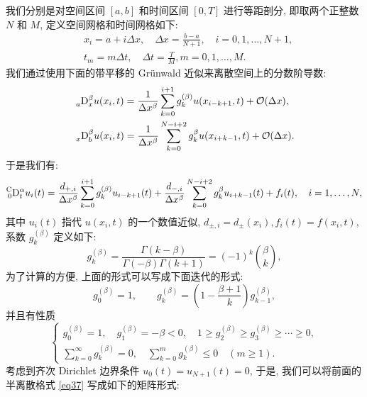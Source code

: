 \documentclass{ecnumaster}
\begin{document}
我们分别是对空间区间 $[a, b]$ 和时间区间 $[0, T]$ 进行等距剖分,
即取两个正整数 $N$ 和 $M$, 定义空间网格和时间网格如下:
\begin{align*}
  &x_i = a + i\Delta x, \quad \Delta x = \frac{b - a}{N + 1},\quad i = 0, 1, \dots , N + 1,\\
  &t_m = m\Delta t, \quad \Delta t = \frac{T}{M}, m = 0, 1, \dots ,M.
\end{align*}
我们通过使用下面的带平移的 Gr\"unwald 近似来离散空间上的分数阶导数\cite{MT04, MT06}:
\begin{equation}
  \begin{split}
  &\prescript{}{a}{\mathrm{D}}_x^{\beta}u(x_i, t) =
  \frac{1}{\Delta x^{\beta}}\sum_{k=0}^{i + 1} g_k^{(\beta)}u(x_{i-k+1}, t) + \mathcal{O}(\Delta x),\\
  &\prescript{}{x}{\mathrm{D}}_b^{\beta}u(x_i, t) =
  \frac{1}{\Delta x^{\beta}}\sum_{k=0}^{N-i+2}g_k^{\beta}u(x_{i+k-1}, t) + \mathcal{O}(\Delta x).
  \end{split}
\end{equation}
于是我们有:
\begin{equation}\label{eq37}
  \prescript{\mathrm{C}}{0}{\mathrm{D}}_t^{\alpha}u_i(t) =
  \frac{{{d}}_{+, i}}{\Delta x^{\beta}}\sum_{k=0}^{i + 1}
  g_k^{(\beta)}u_{i-k+1} (t) + \frac{{{d}}_{-,i}}{\Delta x^{\beta}}\sum_{k=0}^{N-i+2}
  g_k^{\beta}u_{i+k-1} (t) + f_i(t), \quad i = 1, \dots, N,
\end{equation}
其中 $u_i(t)$ 指代 $u(x_i, t)$ 的一个数值近似,
$d_{\pm, i}= d_{\pm}(x_i), f_i(t) = f(x_i, t)$,
系数 $g_k^{(\beta)}$ 定义如下:
\begin{equation}\label{eq38}
g_k^{(\beta)} = \frac{\Gamma(k - \beta)}{\Gamma(-\beta)\Gamma(k + 1)}
= (-1)^k {\beta \choose k},
\end{equation}
为了计算的方便, 上面的形式可以写成下面迭代的形式\cite{P99}:
$$
g_0^{(\beta)} = 1, \qquad g_k^{(\beta)} = \left(1 - \frac{\beta + 1}{k}\right)g_{k-1}^{(\beta)},
$$
并且有性质
\begin{equation}\label{eq310}
  \begin{cases}
    g_0^{(\beta)} = 1, \quad g_1^{(\beta)} = -\beta < 0, \quad 1 \ge g_2^{(\beta)} \ge g_3^{(\beta)} \ge \cdots \ge 0,\\
    \sum\limits_{k=0}^{\infty} g_k^{(\beta)} = 0, \quad \sum\limits _{k=0}^{m} g_k^{(\beta)} \leq 0 \quad (m \ge 1).
  \end{cases}
\end{equation}
考虑到齐次 Dirichlet 边界条件 $u_0(t) = u_{N+1}(t) = 0$,
于是, 我们可以将前面的半离散格式 \eqref{eq37} 写成如下的矩阵形式:
\end{document}
